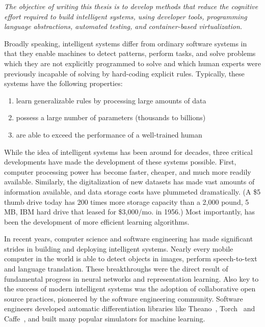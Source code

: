 \documentclass[12pt,initial,twoside,maitrise]{dms}
\numberwithin{equation}{section}
\numberwithin{table}{chapter}
\numberwithin{figure}{chapter}
\begin{document}
\textit{The objective of writing this thesis is to develop methods that reduce the cognitive effort required to build intelligent systems, using developer tools, programming language abstractions, automated testing, and container-based virtualization.}

Broadly speaking, intelligent systems differ from ordinary software systems in that they enable machines to detect patterns, perform tasks, and solve problems which they are not explicitly programmed to solve and which human experts were previously incapable of solving by hard-coding explicit rules. Typically, these systems have the following properties:

\begin{enumerate}
    \item learn generalizable rules by processing large amounts of data
    \item possess a large number of parameters (thousands to billions)
    \item are able to exceed the performance of a well-trained human
\end{enumerate}

While the idea of intelligent systems has been around for decades, three critical developments have made the development of these systems possible. First, computer processing power has become faster, cheaper, and much more readily available. Similarly, the digitalization of new datasets has made vast amounts of information available, and data storage costs have plummeted dramatically. (A \$5 thumb drive today has 200 times more storage capacity than a 2,000 pound, 5 MB, IBM hard drive that leased for \$3,000/mo. in 1956.) Most importantly, has been the development of more efficient learning algorithms.

In recent years, computer science and software engineering has made significant strides in building and deploying intelligent systems. Nearly every mobile computer in the world is able to detect objects in images, perform speech-to-text and language translation. These breakthroughs were the direct result of fundamental progress in neural networks and representation learning. Also key to the success of modern intelligent systems was the adoption of collaborative open source practices, pioneered by the software engineering community. Software engineers developed automatic differentiation libraries like Theano~\cite{theano}, Torch~\cite{collobert2002torch} and Caffe~\cite{jia2014caffe}, and built many popular simulators for machine learning.
\end{document}
